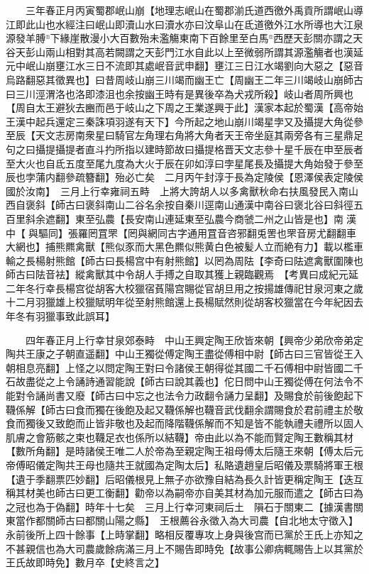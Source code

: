 　　三年春正月丙寅蜀郡岷山崩【地理志岷山在蜀郡湔氏道西徼外禹貢所謂岷山導江即此山也水經注曰岷山即瀆山水曰瀆水亦曰汶阜山在氐道徼外江水所導也大江泉源發羊膊下緣崖散漫小大百數殆未濫觴東南下百餘里至白馬西歷天彭關亦謂之天谷天彭山兩山相對其高若闕謂之天彭門江水自此以上至微弱所謂其源濫觴者也漢延元中岷山崩壅江水三日不流即其處岷音武申翻】壅江三日江水竭劉向大惡之【惡音烏路翻惡其徵異也】曰昔周岐山崩三川竭而幽王亡【周幽王二年三川竭岐山崩師古曰三川涇渭洛也洛即漆沮也余按幽王時有是異後卒為犬戎所殺】岐山者周所興也【周自太王避狄去豳而邑于岐山之下周之王業遂興于此】漢家本起於蜀漢【高帝始王漢中起兵還定三秦誅項羽遂有天下】今所起之地山崩川竭星孛又及攝提大角從參至辰【天文志房南衆星曰騎官左角理右角將大角者天王帝坐庭其兩旁各有三星鼎足句之曰攝提攝提者直斗扚所指以建時節故曰攝提格晋天文志參十星千辰在申至辰者至大火也自氐五度至尾九度為大火于辰在卯如淳曰孛星尾長及攝提大角始發于參至辰也孛蒲内翻參疏簪翻】殆必亡矣　二月丙午封淳于長為定陵侯【恩澤侯表定陵侯國於汝南】　三月上行幸雍祠五畤　上將大誇胡人以多禽獸秋命右扶風發民入南山西自褒斜【師古曰褒斜南山二谷名余按自秦川逕南山通漢中南谷曰褒北谷曰斜徑五百里斜余遮翻】東至弘農【長安南山連延東至弘農今商虢二州之山皆是也】南漢中【與驅同】張羅罔罝罘【罔與網同古字通用罝音咨邪翻兎罟也罘音房尤翻翻車大網也】捕熊羆禽獸【熊似豕而大黑色羆似熊黄白色被髪人立而絶有力】載以檻車輸之長楊射熊館【師古曰長楊宫中有射熊館】以罔為周阹【李奇曰阹遮禽獸圍陳也師古曰阹音袪】縱禽獸其中令胡人手搏之自取其獲上親臨觀焉　【考異曰成紀元延二年冬行幸長楊宫從胡客大校獵宿萯陽宫賜從官胡旦用之按揚雄傳祀甘泉河東之歲十二月羽獵雄上校獵賦明年從至射熊館還上長楊賦然則從胡客校獵當在今年紀因去年冬有羽獵事致此誤耳】

　　四年春正月上行幸甘泉郊泰畤　中山王興定陶王欣皆來朝【興帝少弟欣帝弟定陶共王康之子朝直遥翻】中山王獨從傅定陶王盡從傅相中尉【師古曰三官皆從王入朝相息亮翻】上怪之以問定陶王對曰令諸侯王朝得從其國二千石傅相中尉皆國二千石故盡從之上令誦詩通習能說【師古曰說其義也】佗日問中山王獨從傅在何法令不能對令誦尚書又廢【師古曰中忘之也法令力政翻令誦力呈翻】及賜食於前後飽起下韈係解【師古曰食而獨在後飽及起又韈係解也韈音武伐翻余謂賜食於君前禮主於敬食而獨後又致飽而止皆非敬也及起而降階韈係解而不知是皆不能執禮夫禮所以固人肌膚之會筋骸之束也韈足衣也係所以結韈】帝由此以為不能而賢定陶王數稱其材【數所角翻】是時諸侯王唯二人於帝為至親定陶王祖母傅太后隨王來朝【傅太后元帝傅昭儀定陶共王母也隨共王就國為定陶太后】私賂遺趙皇后昭儀及票騎將軍王根【遺于季翻票匹妙翻】后昭儀根見上無子亦欲豫自結為長久計皆更稱定陶王【迭互稱其材美也師古曰更工衡翻】勸帝以為嗣帝亦自美其材為加元服而遣之【師古曰為之冠也為于偽翻】時年十七矣　三月上行幸河東祠后土　隕石于關東二【據漢書關東當作都關師古曰都關山陽之縣】　王根薦谷永徵入為大司農【自北地太守徵入】永前後所上四十餘事【上時掌翻】略相反覆專攻上身與後宫而已黨於王氏上亦知之不甚親信也為大司農歲餘病滿三月上不賜告即時免【故事公卿病輒賜告上以其黨於王氏故即時免】數月卒【史終言之】

